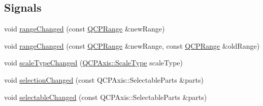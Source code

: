 \subsection*{Signals}
\begin{DoxyCompactItemize}
\item 
void \hyperlink{classQCPAxis_a0894084e4c16a1736534c4095746f910}{range\+Changed} (const \hyperlink{classQCPRange}{Q\+C\+P\+Range} \&new\+Range)
\item 
void \hyperlink{classQCPAxis_aac8576288e8e31f16186124bc10dd10d}{range\+Changed} (const \hyperlink{classQCPRange}{Q\+C\+P\+Range} \&new\+Range, const \hyperlink{classQCPRange}{Q\+C\+P\+Range} \&old\+Range)
\item 
void \hyperlink{classQCPAxis_a3505ed8a93bd2e349d858d84996bf767}{scale\+Type\+Changed} (\hyperlink{classQCPAxis_a36d8e8658dbaa179bf2aeb973db2d6f0}{Q\+C\+P\+Axis\+::\+Scale\+Type} scale\+Type)
\item 
void \hyperlink{classQCPAxis_a62b598abeee7174a05f9d542cc85b1f5}{selection\+Changed} (const Q\+C\+P\+Axis\+::\+Selectable\+Parts \&parts)
\item 
void \hyperlink{classQCPAxis_aa5ff1fd851139028a3bb4efcb31de9fc}{selectable\+Changed} (const Q\+C\+P\+Axis\+::\+Selectable\+Parts \&parts)
\end{DoxyCompactItemize}
